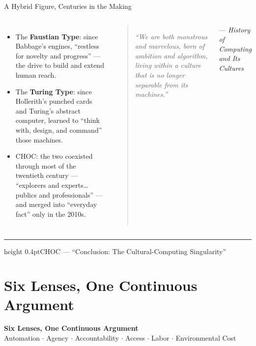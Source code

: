 \documentclass[10pt,aspectratio=1610]{beamer}
\newcommand{\lead}[1]{{\color{gktaccent2}#1}}
\newcommand{\chaptertag}[1]{%
  \vfill{\footnotesize\color{gktmuted}\hrule height 0.4pt\vspace{4pt}CHOC --- #1\par}%
}
\newcommand{\quoteblock}[2]{%
  \begin{quote}\color{gktink}\itshape\enquote{#1}\end{quote}
  {\footnotesize\color{gktmuted}--- #2\par}
}
\begin{document}
\begin{frame}{A Hybrid Figure, Centuries in the Making}
\begin{columns}[T]
\begin{itemize}
\item The \textbf{Faustian Type}: since Babbage's engines, \enquote{restless for novelty and progress} --- the drive to build and extend human reach.
\item The \textbf{Turing Type}: since Hollerith's punched cards and Turing's abstract computer, learned to \enquote{think with, design, and command} those machines.
\item CHOC: the two coexisted through most of the twentieth century --- \enquote{explorers and experts\ldots{} publics and professionals} --- and merged into \enquote{everyday fact} only in the 2010s.
\end{itemize}
\quoteblock{We are both monstrous and marvelous, born of ambition and algorithm, living within a culture that is no longer separable from its machines.}{\emph{History of Computing and Its Cultures}}
\end{columns}
\chaptertag{\enquote{Conclusion: The Cultural-Computing Singularity}}
\end{frame}

\section{Six Lenses, One Continuous Argument}
\begin{frame}[plain]
\centering
{\Large\bfseries\color{gktaccent}Six Lenses, One Continuous Argument}\\[1em]
\lead{\normalsize Automation $\cdot$ Agency $\cdot$ Accountability $\cdot$ Access $\cdot$ Labor $\cdot$ Environmental Cost}
\end{frame}
\end{document}
